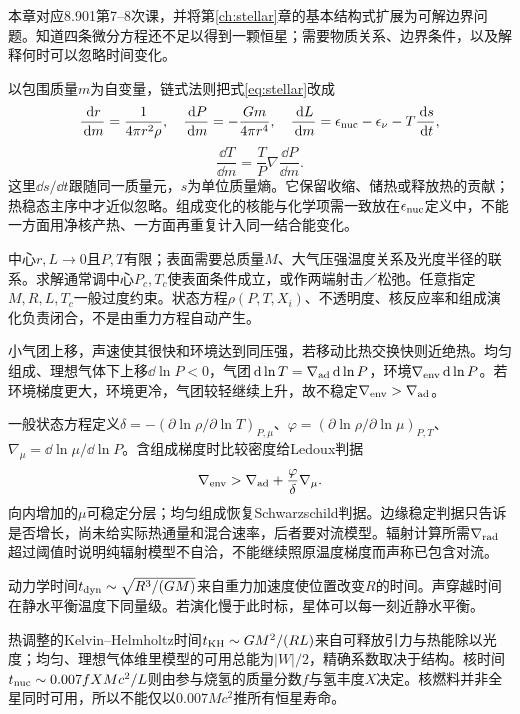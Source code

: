 本章对应8.901第7--8次课，并将第\ref{ch:stellar}章的基本结构式扩展为可解边界问题。知道四条微分方程还不足以得到一颗恒星；需要物质关系、边界条件，以及解释何时可以忽略时间变化。

以包围质量$m$为自变量，链式法则把式\eqref{eq:stellar}改成
\[
 \frac{\,\mathrm d r}{\,\mathrm d m}=\frac1{4\pi r^2\rho},\quad
 \frac{\,\mathrm d P}{\,\mathrm d m}=-\frac{Gm}{4\pi r^4},\quad
 \frac{\,\mathrm d L}{\,\mathrm d m}=\epsilon_{\rm nuc}-\epsilon_\nu-T\frac{\,\mathrm d s}{\,\mathrm d t},
\]
\[
 \frac{\dd T}{\dd m}=\frac{T}{P}\nabla\frac{\dd P}{\dd m}.
\]
这里$\dd s/\dd t$跟随同一质量元，$s$为单位质量熵。它保留收缩、储热或释放热的贡献；热稳态主序中才近似忽略。组成变化的核能与化学项需一致放在$\epsilon_{\rm nuc}$定义中，不能一方面用净核产热、一方面再重复计入同一结合能变化。

中心$r,L\to0$且$P,T$有限；表面需要总质量$M$、大气压强温度关系及光度半径的联系。求解通常调中心$P_c,T_c$使表面条件成立，或作两端射击／松弛。任意指定$M,R,L,T_c$一般过度约束。状态方程$\rho(P,T,X_i)$、不透明度、核反应率和组成演化负责闭合，不是由重力方程自动产生。

小气团上移，声速使其很快和环境达到同压强，若移动比热交换快则近绝热。均匀组成、理想气体下上移$\dd\ln P<0$，气团$\,\mathrm d\ln T=\nabla_{\rm ad}\,\mathrm d\ln P$，环境$\nabla_{\rm env}\,\mathrm d\ln P$。若环境梯度更大，环境更冷，气团较轻继续上升，故不稳定$\nabla_{\rm env}>\nabla_{\rm ad}$。

一般状态方程定义$\delta=-(\partial\ln\rho/\partial\ln T)_{P,\mu}$、$\varphi=(\partial\ln\rho/\partial\ln\mu)_{P,T}$、$\nabla_\mu=\dd\ln\mu/\dd\ln P$。含组成梯度时比较密度给Ledoux判据
\[
 \nabla_{\rm env}>\nabla_{\rm ad}+\frac{\varphi}{\delta}\nabla_\mu .
\]
向内增加的$\mu$可稳定分层；均匀组成恢复Schwarzschild判据。边缘稳定判据只告诉是否增长，尚未给实际热通量和混合速率，后者要对流模型。辐射计算所需$\nabla_{\rm rad}$超过阈值时说明纯辐射模型不自洽，不能继续照原温度梯度而声称已包含对流。

动力学时间$t_{\rm dyn}\sim\sqrt{R^3/(GM)}$来自重力加速度使位置改变$R$的时间。声穿越时间在静水平衡温度下同量级。若演化慢于此时标，星体可以每一刻近静水平衡。

热调整的Kelvin--Helmholtz时间$t_{\rm KH}\sim GM^2/(RL)$来自可释放引力与热能除以光度；均匀、理想气体维里模型的可用总能为$|W|/2$，精确系数取决于结构。核时间$t_{\rm nuc}\sim0.007fXM c^2/L$则由参与烧氢的质量分数$f$与氢丰度$X$决定。核燃料并非全星同时可用，所以不能仅以$0.007Mc^2$推所有恒星寿命。

